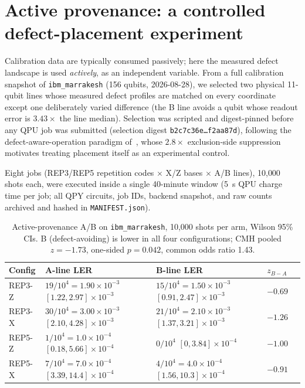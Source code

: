 \documentclass[11pt,a4paper]{article}
\begin{document}
\appendix
\section{Active provenance: a controlled defect-placement experiment}
\label{app:activeprov}

Calibration data are typically consumed passively; here the measured defect
landscape is used \emph{actively}, as an independent variable. From a full
calibration snapshot of \texttt{ibm\_marrakesh} (156 qubits, 2026-08-28), we
selected two physical 11-qubit lines whose measured defect profiles are
matched on every coordinate except one deliberately varied difference (the
B line avoids a qubit whose readout error is $3.43\times$ the line median).
Selection was scripted and digest-pinned before any QPU job was submitted
(selection digest \texttt{b2c7c36e\ldots f2aa87d}), following the
defect-aware-operation paradigm of~\cite{Bartlett2026defect}, whose $2.8\times$
exclusion-side suppression motivates treating placement itself as an
experimental control.

Eight jobs (REP3/REP5 repetition codes $\times$ X/Z bases $\times$ A/B lines),
10{,}000 shots each, were executed inside a single 40-minute window
(5~s QPU charge time per job; all QPY circuits, job IDs, backend snapshot,
and raw counts archived and hashed in \texttt{MANIFEST.json}).

\begin{table}[H]\centering\small
\caption{Active-provenance A/B on \texttt{ibm\_marrakesh}, 10{,}000 shots per
  arm, Wilson 95\% CIs. B (defect-avoiding) is lower in all four
  configurations; CMH pooled $z=-1.73$, one-sided $p=0.042$, common odds
  ratio 1.43.}
\label{tab:ab}
\begin{tabular}{@{}lllll@{}}
\toprule
Config & A-line LER & B-line LER & $z_{B-A}$ \\\midrule
REP3-Z & $19/10^4 = 1.90\times10^{-3}$ $[1.22,2.97]\times10^{-3}$ & $15/10^4 = 1.50\times10^{-3}$ $[0.91,2.47]\times10^{-3}$ & $-0.69$ \\
REP3-X & $30/10^4 = 3.00\times10^{-3}$ $[2.10,4.28]\times10^{-3}$ & $21/10^4 = 2.10\times10^{-3}$ $[1.37,3.21]\times10^{-3}$ & $-1.26$ \\
REP5-Z & $1/10^4 = 1.0\times10^{-4}$ $[0.18,5.66]\times10^{-4}$ & $0/10^4$ $[0,3.84]\times10^{-4}$ & $-1.00$ \\
REP5-X & $7/10^4 = 7.0\times10^{-4}$ $[3.39,14.4]\times10^{-4}$ & $4/10^4 = 4.0\times10^{-4}$ $[1.56,10.3]\times10^{-4}$ & $-0.91$ \\
\bottomrule
\end{tabular}
\end{table}
\end{document}

